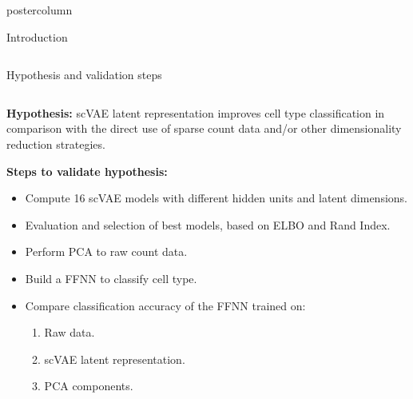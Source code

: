 \documentclass[final,hyperref={pdfpagelabels=false}]{beamer}
\begin{document}
\begin{frame}
\begin{columns}
\begin{column}{.49\paperwidth}
\begin{beamercolorbox}[center,wd=\textwidth]{postercolumn}
\begin{minipage}[T]{.99\textwidth}
{\begin{block}{Introduction}
\begin{columns}
\begin{column}{1\textwidth}
\end{column}
 \end{columns}
 \end{block}
 \vfill



 \begin{block}{Hypothesis and validation steps}
 \begin{columns}
 \begin{column}{1\textwidth}
\centering
\begin{minipage}[t]{0.97\textwidth}
\justifying
\vspace{0.5cm}
\small{\textbf{Hypothesis:} scVAE latent representation improves cell type classification in comparison with the direct use of sparse count data and/or other dimensionality reduction strategies.}
\vspace{1.2cm}

\textbf{Steps to validate hypothesis:}
\vspace{0.3cm}

\begin{itemize}

\item{\small{Compute 16 scVAE models with different hidden units and latent dimensions.}}
\vspace{0.1cm}
\item{\small{Evaluation and selection of best models, based on ELBO and Rand Index.}}
\vspace{0.1cm}
\item{\small{Perform PCA to raw count data.}}
\vspace{0.1cm}
\item{\small{Build a FFNN to classify cell type.
}}
\vspace{0.1cm}
\item{\small{Compare classification accuracy of the FFNN trained on:}}
\begin{enumerate}
\item{\small{Raw data.}}
\item{\small{scVAE latent representation.}}
\item{\small{PCA components.}}
\end{enumerate}
\vspace{0.1cm}
\end{itemize}

\end{minipage} 


\end{column}
\end{columns}
\end{block}}
\end{minipage}
\end{beamercolorbox}
\end{column}
\end{columns}
\end{frame}
\end{document}
